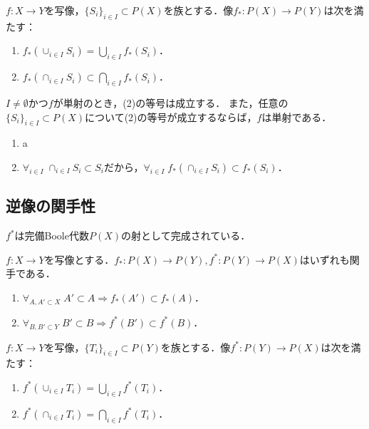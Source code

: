 \documentclass[uplatex,dvipdfmx]{jsreport}
\begin{document}
\begin{proposition}[像は和のみを保つ]\label{prop-image-preserve-unions}
    $f:X\to Y$を写像，$\{S_i\}_{i\in I}\subset P(X)$を族とする．像$f_*:P(X)\to P(Y)$は次を満たす：
    \begin{enumerate}
        \item $f_*(\cup_{i\in I}S_i)=\bigcup_{i\in I}f_*(S_i)$．
        \item $f_*(\cap_{i\in I}S_i)\subset\bigcap_{i\in I}f_*(S_i)$．
    \end{enumerate}
    $I\ne\emptyset$かつ$f$が単射のとき，(2)の等号は成立する．
    また，任意の$\{S_i\}_{i\in I}\subset P(X)$について(2)の等号が成立するならば，$f$は単射である．
\end{proposition}
\begin{Proof}\mbox{}
    \begin{enumerate}
        \item a
        \item $\forall_{i\in I}\;\cap_{i\in I}S_i\subset S_i$だから，$\forall_{i\in I}\;f_*(\cap_{i\in I}S_i)\subset f_*(S_i)$．
    \end{enumerate}
\end{Proof}

\subsection{逆像の関手性}

\begin{tcolorbox}[colframe=ForestGreen, colback=ForestGreen!10!white,breakable,colbacktitle=ForestGreen!40!white,coltitle=black,fonttitle=\bfseries\sffamily,
title=]
    $f^*$は完備Boole代数$P(X)$の射として完成されている．
\end{tcolorbox}

\begin{proposition}[順序の保存]
    $f:X\to Y$を写像とする．$f_*:P(X)\to P(Y),f^*:P(Y)\to P(X)$はいずれも関手である．
    \begin{enumerate}
        \item $\forall_{A,A'\subset X}\;A'\subset A\Rightarrow f_*(A')\subset f_*(A)$．
        \item $\forall_{B,B'\subset Y}\;B'\subset B\Rightarrow f^*(B')\subset f^*(B)$．
    \end{enumerate}
\end{proposition}

\begin{proposition}[逆像は和と積を保つ]
    $f:X\to Y$を写像，$\{T_i\}_{i\in I}\subset P(Y)$を族とする．像$f^*:P(Y)\to P(X)$は次を満たす：
    \begin{enumerate}
        \item $f^*(\cup_{i\in I}T_i)=\bigcup_{i\in I}f^*(T_i)$．
        \item  $f^*(\cap_{i\in I}T_i)=\bigcap_{i\in I}f^*(T_i)$．
    \end{enumerate}
\end{proposition}
\end{document}
